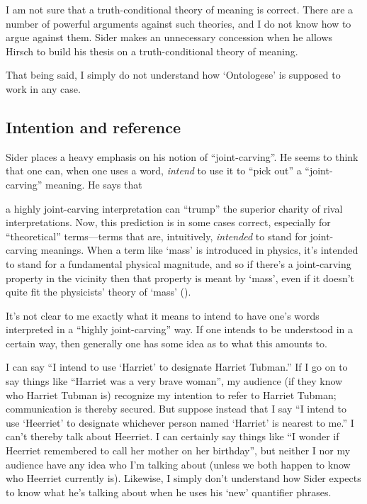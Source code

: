 \documentclass[11pt]{article}
\newenvironment{squote}{%
\begin{spacing}{1}
       	\begin{list}{}{%
\setlength{\labelwidth}{0pt}%
\rightmargin\leftmargin%
}
\item\relax
}{%
\end{list}%
\end{spacing}
}
\begin{document}
\begin{spacing}{1.25}
I am not sure that a truth-conditional theory of meaning is correct.
There are a number of powerful arguments against such theories, and I
do not know how to argue against them.  Sider makes an unnecessary
concession when he allows Hirsch to build his thesis on a
truth-conditional theory of meaning.

That being said, I simply do not understand how `Ontologese' is
supposed to work in any case.

\subsection{Intention and reference}
Sider places a heavy emphasis on his notion of ``joint-carving''.  He
seems to think that one can, when one uses a word, {\em intend} to use
it to ``pick out'' a ``joint-carving'' meaning.  He says that

\begin{squote}
a highly joint-carving interpretation can ``trump'' the superior
charity of rival interpretations.  Now, this prediction is in some
cases correct, especially for ``theoretical'' terms---terms that are,
intuitively, {\em intended} to stand for joint-carving meanings.  When
a term like `mass' is introduced in physics, it's intended to stand
for a fundamental physical magnitude, and so if there's a
joint-carving property in the vicinity then that property is meant by
`mass', even if it doesn't quite fit the physicists' theory of `mass'
(\citeyear[32]{sider2011d}).
\end{squote}

It's not clear to me exactly what it means to intend to have one's
words interpreted in a ``highly joint-carving'' way.  If one intends
to be understood in a certain way, then generally one has some idea as
to what this amounts to.

I can say ``I intend to use `Harriet' to designate Harriet Tubman.''
If I go on to say things like ``Harriet was a very brave woman'', my
audience (if they know who Harriet Tubman is) recognize my intention
to refer to Harriet Tubman; communication is thereby secured.  But
suppose instead that I say ``I intend to use `Heerriet' to designate
whichever person named `Harriet' is nearest to me.''  I can't thereby
talk about Heerriet.  I can certainly say things like ``I wonder if
Heerriet remembered to call her mother on her birthday'', but neither
I nor my audience have any idea who I'm talking about (unless we both
happen to know who Heerriet currently is).  Likewise, I simply don't
understand how Sider expects to know what he's talking about when he
uses his `new' quantifier phrases.


\end{spacing}
\end{document}
